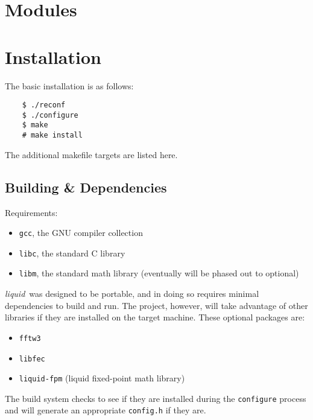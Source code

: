 \documentclass[11pt,twoside]{report}
\newcommand{\liquid}{{\it liquid}}
\begin{document}
\chapter{Modules}
\label{ch:modules}

























%
%
\chapter{Installation}
\label{ch:installation}
The basic installation is as follows:
\begin{verbatim}
    $ ./reconf
    $ ./configure
    $ make
    # make install
\end{verbatim}
The additional makefile targets are listed here.

\section{Building \& Dependencies}
\label{ch:installation:building}
Requirements:
\begin{itemize}
\item {\tt gcc}, the GNU compiler collection
\item {\tt libc}, the standard C library
\item {\tt libm}, the standard math library (eventually will be phased out to
optional)
\end{itemize}

\liquid\ was designed to be portable, and in doing so requires minimal dependencies to
build and run.
The project, however, will take advantage of other libraries if they are installed on the
target machine.
These optional packages are:
\begin{itemize}
\item {\tt fftw3}
\item {\tt libfec}
\item {\tt liquid-fpm} (liquid fixed-point math library)
\end{itemize}
The build system checks to see if they are installed during the {\tt configure} process
and will generate an appropriate {\tt config.h} if they are.
\end{document}
